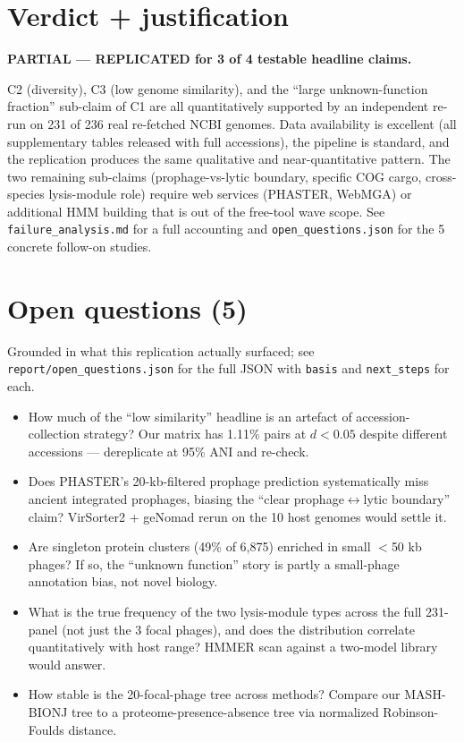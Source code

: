 \documentclass[11pt]{article}
\begin{document}
\section{Verdict + justification}

\textbf{PARTIAL --- REPLICATED for 3 of 4 testable headline claims.}

C2 (diversity), C3 (low genome similarity), and the ``large unknown-function fraction'' sub-claim of C1 are all quantitatively supported by an independent re-run on 231 of 236 real re-fetched NCBI genomes. Data availability is excellent (all supplementary tables released with full accessions), the pipeline is standard, and the replication produces the same qualitative and near-quantitative pattern. The two remaining sub-claims (prophage-vs-lytic boundary, specific COG cargo, cross-species lysis-module role) require web services (PHASTER, WebMGA) or additional HMM building that is out of the free-tool wave scope. See \texttt{failure\_analysis.md} for a full accounting and \texttt{open\_questions.json} for the 5 concrete follow-on studies.

\section{Open questions (5)}

Grounded in what this replication actually surfaced; see \texttt{report/open\_questions.json} for the full JSON with \texttt{basis} and \texttt{next\_steps} for each.

\begin{itemize}
    \item[\textbf{Q1}] How much of the ``low similarity'' headline is an artefact of accession-collection strategy? Our matrix has 1.11\% pairs at $d < 0.05$ despite different accessions --- dereplicate at 95\% ANI and re-check.
    \item[\textbf{Q2}] Does PHASTER's 20-kb-filtered prophage prediction systematically miss ancient integrated prophages, biasing the ``clear prophage$\leftrightarrow$lytic boundary'' claim? VirSorter2 + geNomad rerun on the 10 host genomes would settle it.
    \item[\textbf{Q3}] Are singleton protein clusters (49\% of 6{,}875) enriched in small $<$50 kb phages? If so, the ``unknown function'' story is partly a small-phage annotation bias, not novel biology.
    \item[\textbf{Q4}] What is the true frequency of the two lysis-module types across the full 231-panel (not just the 3 focal phages), and does the distribution correlate quantitatively with host range? HMMER scan against a two-model library would answer.
    \item[\textbf{Q5}] How stable is the 20-focal-phage tree across methods? Compare our MASH-BIONJ tree to a proteome-presence-absence tree via normalized Robinson-Foulds distance.
\end{itemize}
\end{document}
